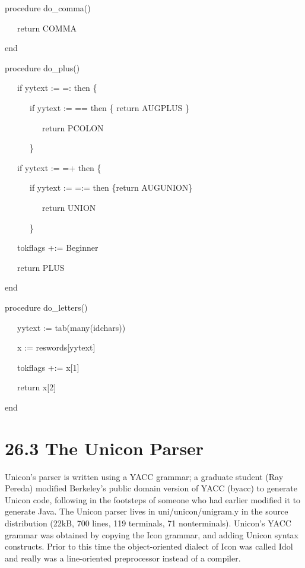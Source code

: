 {\ttfamily\mdseries
procedure do\_comma()}

{\ttfamily\mdseries
\ \ \ return COMMA}

{\ttfamily\mdseries
end}


\bigskip

{\ttfamily\mdseries
procedure do\_plus()}

{\ttfamily\mdseries
\ \ \ if yytext {\textbar}{\textbar}:= ={\textquotedbl}:{\textquotedbl} then \{}

{\ttfamily\mdseries
\ \ \ \ \ \ if yytext {\textbar}{\textbar}:= ={\textquotedbl}={\textquotedbl} then \{ return AUGPLUS \}}

{\ttfamily\mdseries
\ \ \ \ \ \ \ \ \ return PCOLON}

{\ttfamily\mdseries
\ \ \ \ \ \ \}}

{\ttfamily\mdseries
\ \ \ if yytext {\textbar}{\textbar}:= ={\textquotedbl}+{\textquotedbl} then \{}

{\ttfamily\mdseries
\ \ \ \ \ \ if yytext {\textbar}{\textbar}:= ={\textquotedbl}:={\textquotedbl} then \{return AUGUNION\}}

{\ttfamily\mdseries
\ \ \ \ \ \ \ \ \ return UNION}

{\ttfamily\mdseries
\ \ \ \ \ \ \}}

{\ttfamily\mdseries
\ \ \ tokflags +:= Beginner}

{\ttfamily\mdseries
\ \ \ return PLUS}

{\ttfamily\mdseries
end}


\bigskip

{\ttfamily\mdseries
procedure do\_letters()}

{\ttfamily\mdseries
\ \ \ yytext {\textbar}{\textbar}:= tab(many(idchars))}

{\ttfamily\mdseries
\ \ \ x := reswords[yytext]}

{\ttfamily\mdseries
\ \ \ tokflags +:= x[1]}

{\ttfamily\mdseries
\ \ \ return x[2]}

{\ttfamily\mdseries
end}

\section[26.3 The Unicon Parser]{26.3 The Unicon Parser}

Unicon's parser is written using a YACC grammar; a graduate student
(Ray Pereda) modified Berkeley's public domain version of YACC (byacc)
to generate Unicon code, following in the footsteps of someone who had
earlier modified it to generate Java. The Unicon parser lives in
uni/unicon/unigram.y in the source distribution (22kB, 700 lines, 119
terminals, 71 nonterminals). Unicon's YACC grammar was obtained by
copying the Icon grammar, and adding Unicon syntax constructs. Prior
to this time the object-oriented dialect of Icon was called Idol and
really was a line-oriented preprocessor instead of a compiler.

